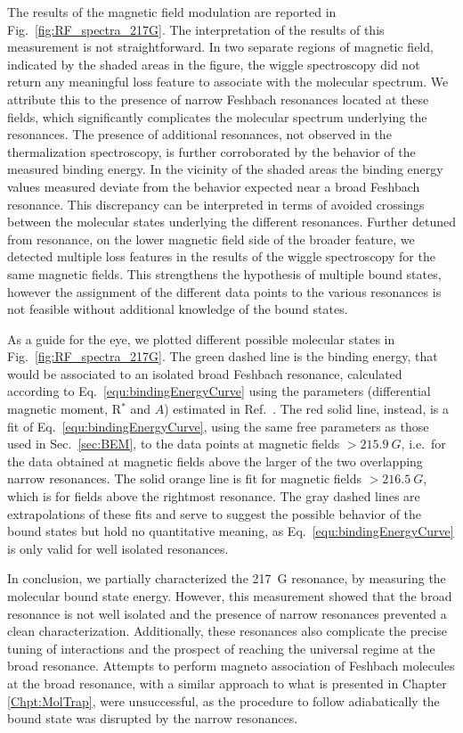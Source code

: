 The results of the magnetic field modulation are reported in Fig.~\ref{fig:RF_spectra_217G}. The interpretation of the results of this measurement is not straightforward. In two separate regions of magnetic field, indicated by the shaded areas in the figure,  the wiggle spectroscopy did not return any meaningful loss feature to associate  with the  molecular spectrum. We attribute this to the presence of narrow Feshbach resonances located at these fields, which significantly complicates  the molecular spectrum underlying the resonances. The presence of additional resonances, not observed in the thermalization spectroscopy, is further corroborated by the behavior of the measured binding energy. In the vicinity of the shaded areas the binding energy values measured deviate from the behavior expected near a broad Feshbach resonance. This discrepancy can be interpreted in terms of avoided crossings between the molecular states underlying the different resonances. Further detuned from resonance, on the lower magnetic field side of the broader feature, we detected multiple loss features in the results of the wiggle spectroscopy for the same magnetic fields. This strengthens the hypothesis of multiple bound states, however the assignment of the different data points to the various resonances is not feasible without additional knowledge of the bound states.

As a guide for the eye, we plotted different possible molecular states in Fig.~\ref{fig:RF_spectra_217G}. The green dashed line is the binding energy, that would be associated to an isolated broad Feshbach resonance, calculated according to Eq.~\eqref{equ:bindingEnergyCurve} using the parameters (differential magnetic moment,  R$^*$ and $A$) estimated in Ref.~\cite{Ravensbergen2020rif}. The red solid line, instead, is a fit  of Eq.~\eqref{equ:bindingEnergyCurve}, using the same free parameters as those used in Sec.~\ref{sec:BEM}, to the data points at magnetic fields $> \SI{215.9}{G}$, i.e.~for the data obtained at magnetic fields above the larger of the two overlapping narrow resonances. The solid orange line is fit for magnetic fields $>\SI{216.5}{G}$, which is for fields above the rightmost resonance. The gray dashed lines are extrapolations of these fits and serve to suggest the possible behavior of the  bound states but hold no quantitative meaning, as Eq.~\eqref{equ:bindingEnergyCurve} is only valid for well isolated resonances. 


In conclusion, we partially characterized the \SI{217}{G} resonance, by measuring the molecular bound state energy. However, this measurement showed that the broad resonance is not well isolated and the presence of narrow resonances prevented a clean characterization. Additionally, these resonances also complicate the precise tuning of interactions and the prospect of reaching the universal regime at the broad resonance. Attempts to perform magneto association of Feshbach molecules at the broad resonance, with a similar approach to what is presented in Chapter \ref{Chpt:MolTrap}, were unsuccessful, as the procedure to follow adiabatically the bound state  was disrupted by the narrow resonances.

